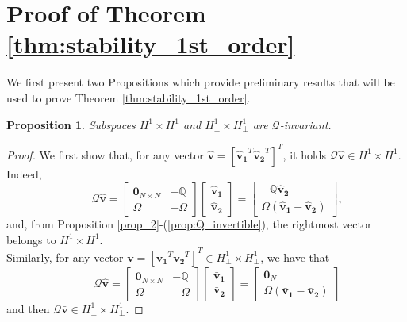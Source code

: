 \documentclass[a4paper]{article}
\theoremstyle{plain}
\newtheorem{prp}{Proposition}
\newcommand{\Qset}{\mathbb{Q}}
\begin{document}
    \section{Proof of Theorem \ref{thm:stability_1st_order}}
\label{appendix_2}
We first present two Propositions which provide preliminary results that will be used to prove Theorem \ref{thm:stability_1st_order}.
\begin{prp}
	\label{prop:h1_h1}
	Subspaces $H^1\times H^1$ and $H^1_{\perp}\times H^1_{\perp}$ are $\mathcal{Q}$-invariant.
\end{prp}
\begin{proof}
	We first show that, for any vector $\mathbf{\hat v} = [\mathbf{\hat{v}_1}^T \mathbf{\hat{v}_2}^T]^T$, it holds $\mathcal{Q}\mathbf{\hat v}\in H^1\times H^1$. Indeed,
	\begin{equation*}
	\qquad\mathcal{Q} \mathbf{\hat v} =
	\begin{bmatrix}
	\mathbf{0}_{N\times N} & -\Qset\\
	\Omega & -\Omega 
	\end{bmatrix}  \begin{bmatrix}
	\mathbf{\hat{v}_1}\\
	\mathbf{\hat{v}_2}
	\end{bmatrix}=\begin{bmatrix}
	-\mathbb{Q}\mathbf{\hat{v}_2}\\
	\Omega(\mathbf{\hat{v}_1}-\mathbf{\hat {v}_2})
	\end{bmatrix},
	\end{equation*}
	and, from Proposition \ref{prop_2}-(\ref{prop:Q_invertible}), the rightmost vector belongs to $H^1\times H^1$.\\
	Similarly, for any vector $\mathbf{\bar v} = [\mathbf{\bar{v}_1}^T \mathbf{\bar{v}_2}^T]^T\in H^1_{\perp}\times H^1_{\perp}$, we have that
	\begin{equation*}
	\qquad\mathcal{Q} \mathbf{\hat v} =
	\begin{bmatrix}
	\mathbf{0}_{N\times N}& -\Qset\\
	\Omega & -\Omega 
	\end{bmatrix}  \begin{bmatrix}
	\mathbf{\bar{v}_1}\\
	\mathbf{\bar{v}_2}
	\end{bmatrix}=\begin{bmatrix}
	\mathbf{0}_N\\
	\Omega(\mathbf{\bar{v}_1}-\mathbf{\bar {v}_2})
	\end{bmatrix}
	\end{equation*}
	and then $\mathcal{Q}\mathbf{\bar v}\in H_{\perp}^1\times H^1_{\perp}$.
\end{proof}
\end{document}
